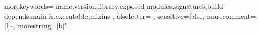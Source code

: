     \renewcommand{\topfraction}{0.9}	%
    \renewcommand{\bottomfraction}{0.8}	%
    \setcounter{topnumber}{2}
    \setcounter{bottomnumber}{2}
    \setcounter{totalnumber}{4}     %
    \setcounter{dbltopnumber}{2}    %
    \renewcommand{\dbltopfraction}{0.9}	%
    \renewcommand{\textfraction}{0.07}	%
    \renewcommand{\floatpagefraction}{0.7}	%
    \renewcommand{\dblfloatpagefraction}{0.7}	%

%
{
  morekeywords={
    name,version,library,exposed-modules,signatures,build-depends,main-is,executable,mixins
  },
  alsoletter=-,
  sensitive=false, %
  morecomment=[l]{--}, %
  morestring=[b]" %
}
